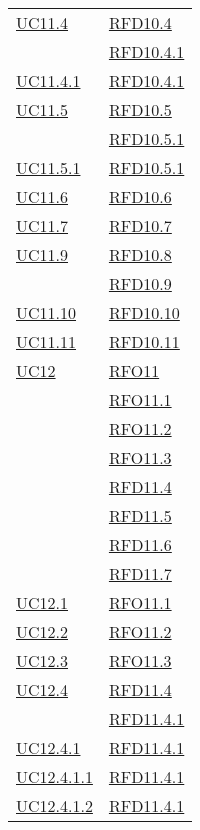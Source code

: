 \begin{longtable}{|>{\centering}m{5cm}|m{5cm}<{\centering}|}
\hyperref[UC11.4]{UC11.4} & \hyperlink{RFD10.4}{RFD10.4}\\
& \hyperlink{RFD10.4.1}{RFD10.4.1}\\ \hline
\hyperref[UC11.4.1]{UC11.4.1} & \hyperlink{RFD10.4.1}{RFD10.4.1}\\ \hline
\hyperref[UC11.5]{UC11.5} & \hyperlink{RFD10.5}{RFD10.5}\\
& \hyperlink{RFD10.5.1}{RFD10.5.1}\\ \hline
\hyperref[UC11.5.1]{UC11.5.1} & \hyperlink{RFD10.5.1}{RFD10.5.1}\\ \hline
\hyperref[UC11.6]{UC11.6} & \hyperlink{RFD10.6}{RFD10.6}\\ \hline
\hyperref[UC11.7]{UC11.7} & \hyperlink{RFD10.7}{RFD10.7}\\ \hline
\hyperref[UC11.9]{UC11.9} & \hyperlink{RFD10.8}{RFD10.8}\\
& \hyperlink{RFD10.9}{RFD10.9}\\ \hline
\hyperref[UC11.10]{UC11.10} & \hyperlink{RFD10.10}{RFD10.10}\\ \hline
\hyperref[UC11.11]{UC11.11} & \hyperlink{RFD10.11}{RFD10.11}\\ \hline
\hyperref[UC12]{UC12} & \hyperlink{RFO11}{RFO11}\\
& \hyperlink{RFO11.1}{RFO11.1}\\
& \hyperlink{RFO11.2}{RFO11.2}\\
& \hyperlink{RFO11.3}{RFO11.3}\\
& \hyperlink{RFD11.4}{RFD11.4}\\
& \hyperlink{RFD11.5}{RFD11.5}\\
& \hyperlink{RFD11.6}{RFD11.6}\\
& \hyperlink{RFD11.7}{RFD11.7}\\ \hline
\hyperref[UC12.1]{UC12.1} & \hyperlink{RFO11.1}{RFO11.1}\\ \hline
\hyperref[UC12.2]{UC12.2} & \hyperlink{RFO11.2}{RFO11.2}\\ \hline
\hyperref[UC12.3]{UC12.3} & \hyperlink{RFO11.3}{RFO11.3}\\ \hline
\hyperref[UC12.4]{UC12.4} & \hyperlink{RFD11.4}{RFD11.4}\\
& \hyperlink{RFD11.4.1}{RFD11.4.1}\\ \hline
\hyperref[UC12.4.1]{UC12.4.1} & \hyperlink{RFD11.4.1}{RFD11.4.1}\\ \hline
\hyperref[UC12.4.1.1]{UC12.4.1.1} & \hyperlink{RFD11.4.1}{RFD11.4.1}\\ \hline
\hyperref[UC12.4.1.2]{UC12.4.1.2} & \hyperlink{RFD11.4.1}{RFD11.4.1}\\ \hline

\end{longtable}
